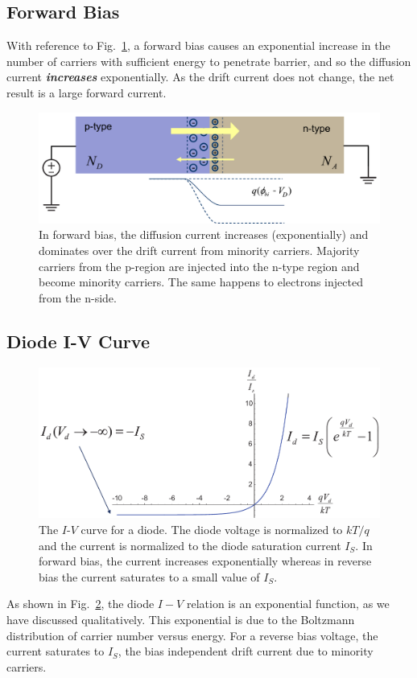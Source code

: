 \subsection{Forward Bias}
With reference to Fig.~\ref{fig:slide36b}, a forward bias causes an exponential increase in the number of carriers with sufficient energy to penetrate barrier, and so the diffusion current \textbf{\textit{increases}} exponentially.  As the drift current does not change, the net result is a large forward current.
\begin{figure}[tb]
\centering
\includegraphics[width=.75\columnwidth]{slide36b}
\caption{In forward bias, the diffusion current increases (exponentially) and dominates over the drift current from minority carriers.  Majority carriers from the p-region are injected into the n-type region and become minority carriers. The same happens to electrons injected from the n-side.}
\label{fig:slide36b}
\end{figure}
\subsection{Diode I-V Curve}
\begin{figure}[tb]
\centering
\includegraphics[width=.75\columnwidth]{slide38}
\caption{The $I$-$V$ curve for a diode.  The diode voltage is normalized to $kT/q$ and the current is normalized to the diode saturation current $I_S$.   In forward bias, the current increases exponentially whereas in reverse bias the current saturates to a small value of $I_S$.}
\label{fig:slide38}
\end{figure}
As shown in Fig.~\ref{fig:slide38}, the diode $I-V$ relation is an exponential function, as we have discussed qualitatively.    This exponential is due to the Boltzmann distribution of carrier number versus energy.    For a reverse bias voltage,  the current saturates to $I_S$, the bias independent drift current due to minority carriers.
